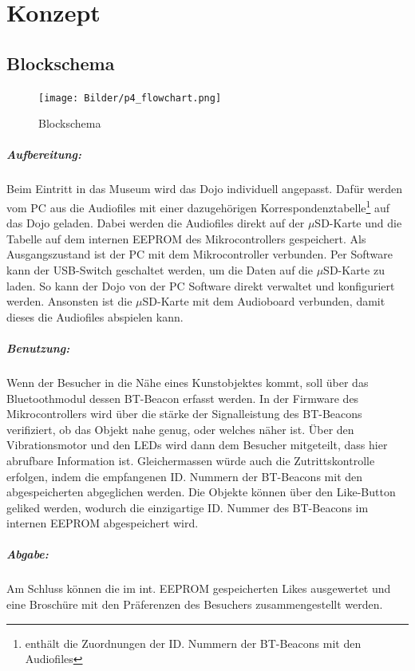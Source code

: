 \chapter{Konzept}
\thispagestyle{fancy} 
\section{Blockschema}
\begin{figure}[H]
\centering
\texttt{[image: Bilder/p4\_flowchart.png]}
\caption{Blockschema}
\label{fig:flowchart}
\end{figure}
\vspace*{-0.6cm}
\newpage
\paragraph*{Aufbereitung:}
Beim Eintritt in das Museum wird das Dojo individuell angepasst. Dafür werden vom PC aus die Audiofiles mit einer dazugehörigen Korrespondenztabelle\footnote{enthält die Zuordnungen der ID. Nummern der BT-Beacons mit den Audiofiles } auf das Dojo geladen. Dabei werden die Audiofiles direkt auf der $\mu$SD-Karte und die Tabelle auf dem internen EEPROM des Mikrocontrollers gespeichert. Als Ausgangszustand ist der PC mit dem Mikrocontroller verbunden. Per Software kann der USB-Switch geschaltet werden, um die Daten auf die $\mu$SD-Karte zu laden. So kann der Dojo von der PC Software direkt verwaltet und konfiguriert werden. Ansonsten ist die $\mu$SD-Karte mit dem Audioboard verbunden, damit dieses die Audiofiles abspielen kann.
\paragraph*{Benutzung:}
Wenn der Besucher in die Nähe eines Kunstobjektes kommt, soll über das Bluetoothmodul dessen BT-Beacon erfasst werden. In der Firmware des Mikrocontrollers wird über die stärke der Signalleistung des BT-Beacons verifiziert, ob das Objekt nahe genug, oder welches näher ist. Über den Vibrationsmotor und den LEDs wird dann dem Besucher mitgeteilt, dass hier abrufbare Information ist. Gleichermassen würde auch die Zutrittskontrolle erfolgen, indem die empfangenen ID. Nummern der BT-Beacons mit den abgespeicherten abgeglichen werden. Die Objekte können über den Like-Button geliked werden, wodurch die einzigartige ID. Nummer des BT-Beacons im internen EEPROM abgespeichert wird.
\paragraph*{Abgabe:}
Am Schluss können die im int. EEPROM gespeicherten Likes ausgewertet und eine Broschüre mit den Präferenzen des Besuchers zusammengestellt werden.
